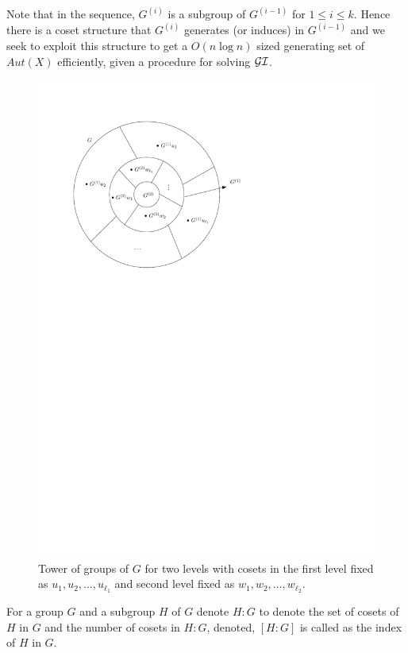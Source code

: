 Note that in the sequence, $G^{(i)}$ is a subgroup of $G^{(i-1)}$ for $ 1 \le i
\le k$. Hence there is a coset structure that $G^{(i)}$ generates (or induces) 
in $G^{(i-1)}$ and we seek to exploit this structure to get a $O(n\log n)$
sized generating set of $Aut(X)$ efficiently, given a procedure for solving 
$\mathcal{GI}$. 
\begin{figure}[htp!]
	\centering
	\includegraphics[scale=0.8]{images/tower.pdf}
	\caption{Tower of groups of $G$ for two levels with cosets in the
		first level fixed as $u_1,u_2,\ldots, u_{\ell_1}$ and second
		level fixed as $w_1,w_2,\ldots,w_{\ell_2}$.}
	\label{fig:tower}
\end{figure}

\begin{definition}
	For a group $G$ and a subgroup $H$ of $G$ denote $H:G$ to denote the
	set of cosets of $H$ in $G$ and the number of cosets in $H:G$,
	denoted, $[H:G]$ is called as the index of $H$ in $G$.
\end{definition}

